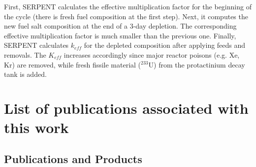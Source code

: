 \documentclass[letterpaper]{article}
\begin{document}
First, SERPENT calculates the effective multiplication factor for the beginning
of the cycle (there is fresh fuel composition at the first step). Next, it
computes the new fuel salt composition at the end of a 3-day depletion. The
corresponding effective multiplication factor is much smaller than the previous
one. Finally, SERPENT calculates $k_{eff}$ for the depleted composition after
applying feeds and removals. The $K_{eff}$ increases accordingly since major reactor
poisons (e.g. Xe, Kr) are removed, while fresh fissile material ($^{233}$U)
from the protactinium decay tank is added.


\FloatBarrier


\section{List of publications associated with this work}



\subsection{Publications and Products}
\end{document}
